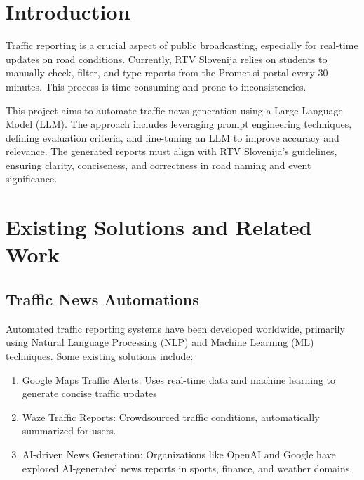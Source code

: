 \documentclass[fleqn,moreauthors,10pt]{ds_report}
\affiliation{\textit{Advisors: Slavko Žitnik}}
\begin{document}
\flushbottom 

\maketitle 

\thispagestyle{empty} 


\section*{Introduction}
	Traffic reporting is a crucial aspect of public broadcasting, especially for real-time updates on road conditions. Currently, RTV Slovenija relies on students to manually check, filter, and type reports from the Promet.si portal every 30 minutes. This process is time-consuming and prone to inconsistencies.

This project aims to automate traffic news generation using a Large Language Model (LLM). The approach includes leveraging prompt engineering techniques, defining evaluation criteria, and fine-tuning an LLM to improve accuracy and relevance. The generated reports must align with RTV Slovenija’s guidelines, ensuring clarity, conciseness, and correctness in road naming and event significance.



\section*{Existing Solutions and Related Work}

\subsection*{Traffic News Automations}
Automated traffic reporting systems have been developed worldwide, primarily using Natural Language Processing (NLP) and Machine Learning (ML) techniques. Some existing solutions include:

\begin{enumerate}[noitemsep] 
	\item Google Maps Traffic Alerts: Uses real-time data and machine learning to generate concise traffic updates
    
	\item Waze Traffic Reports: Crowdsourced traffic conditions, automatically summarized for users.
    
	\item AI-driven News Generation: Organizations like OpenAI and Google have explored AI-generated news reports in sports, finance, and weather domains.
\end{enumerate}
\end{document}
